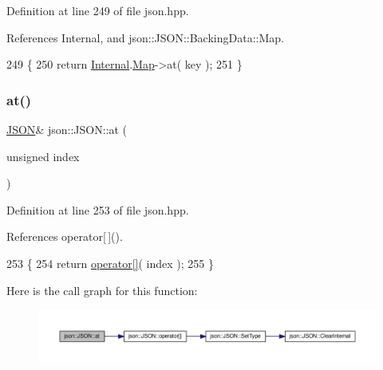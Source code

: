 Definition at line 249 of file json.\+hpp.



References Internal, and json\+::\+J\+S\+O\+N\+::\+Backing\+Data\+::\+Map.


\begin{DoxyCode}
249                                                   \{
250             \textcolor{keywordflow}{return} \mbox{\hyperlink{classjson_1_1_j_s_o_n_a1e2a064794c3d55c8bb8887fc5734947}{Internal}}.\mbox{\hyperlink{unionjson_1_1_j_s_o_n_1_1_backing_data_ab2e19b00745b37d2add157ff3a35c431}{Map}}->at( key );
251         \}
\end{DoxyCode}
\mbox{\label{classjson_1_1_j_s_o_n_ab78dbe91cd205fcc61002f29271ee611}} 
\subsubsection{\texorpdfstring{at()}{at()}\hspace{0.1cm}{\footnotesize\ttfamily [3/4]}}
{\footnotesize\ttfamily \mbox{\hyperlink{classjson_1_1_j_s_o_n}{J\+S\+ON}}\& json\+::\+J\+S\+O\+N\+::at (\begin{DoxyParamCaption}\item[{unsigned}]{index }\end{DoxyParamCaption})\hspace{0.3cm}{\ttfamily [inline]}}



Definition at line 253 of file json.\+hpp.



References operator\mbox{[}$\,$\mbox{]}().


\begin{DoxyCode}
253                                    \{
254             \textcolor{keywordflow}{return} \mbox{\hyperlink{classjson_1_1_j_s_o_n_a29c695c67a5b34a3b59af0da3c25d6b1}{operator[]}}( index );
255         \}
\end{DoxyCode}
Here is the call graph for this function\+:
\nopagebreak
\begin{figure}[H]
\begin{center}
\leavevmode
\includegraphics[width=350pt]{classjson_1_1_j_s_o_n_ab78dbe91cd205fcc61002f29271ee611_cgraph}
\end{center}
\end{figure}
\mbox{\label{classjson_1_1_j_s_o_n_a06b051e5e1fc6e6274290042b9a7985d}} 
